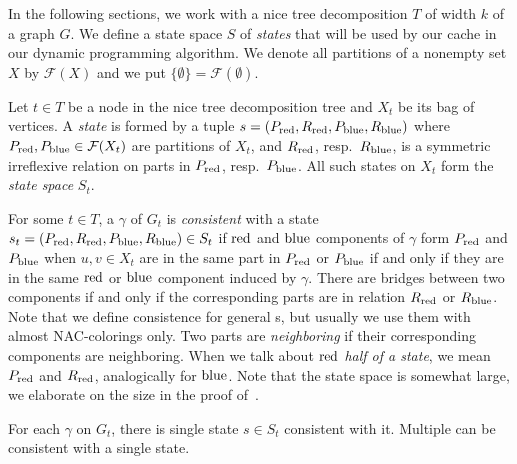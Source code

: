In the following sections,
we work with a nice tree decomposition \( T \) of width \( k \)
of a graph \( G \).
%
We define a state space \( S \) of \emph{states}
that will be used by our cache in our dynamic programming algorithm.
We denote all partitions of a nonempty set \( X \) by \( \mathcal{F}(X) \)
and we put \( \{\emptyset\} = \mathcal{F}(\emptyset) \).

%
\begin{definition}
	Let \( t \in T \) be a node in the nice tree decomposition tree and
	\( X_t \) be its bag of vertices.
	A \emph{state} is formed by a tuple \( s = (P_{\text{red}}, R_{\text{red}}, P_{\text{blue}}, R_{\text{blue}}) \)
	where \( P_{\text{red}}, P_{\text{blue}} \in \mathcal{F}(X_t)\) are partitions of \( X_t \),
	and \( R_{\text{red}}\), resp.\ \(R_{\text{blue}} \), is a symmetric irreflexive relation
	on parts in \( P_{\text{red}}\), resp.\ \(P_{\text{blue}} \).
	All such states on \( X_t \) form the \emph{state space} \( S_t \).
\end{definition}
%
For some \( t \in T \), a \rbcol{} \( \gamma \) of \( G_t \)
is \emph{consistent} with a state \( s_t = (P_{\text{red}}, R_{\text{red}}, P_{\text{blue}}, R_{\text{blue}}) \in S_t \)
if \( \text{red} \) and \( \text{blue} \) components of \( \gamma \) form \( P_{\text{red}} \) and \( P_{\text{blue}} \)
when \( u, v \in X_t \) are in the same part in \( P_{\text{red}} \) or \( P_{\text{blue}} \)
if and only if they are in the same \( \text{red} \) or \( \text{blue} \) component induced by \( \gamma \).
There are bridges between two components if and only if
the corresponding parts are in relation \( R_{\text{red}} \) or \( R_{\text{blue}} \).
%
Note that we define consistence for general \rbcol{}s,
but usually we use them with almost NAC-colorings only.
%
Two parts are \emph{neighboring} if their corresponding components are neighboring.
When we talk about \emph{\( \text{red} \) half of a state},
we mean \( P_{\text{red}} \) and \( R_{\text{red}} \),
analogically for \( \text{blue} \).
%
Note that the state space is somewhat large,
we elaborate on the size in the proof of~.
%
\begin{observation}
	For each \rbcol{} \( \gamma \) on \( G_t \),
	there is single state \( s \in S_t \) consistent with it.
	Multiple \rbcol{} can be consistent with a single state.
\end{observation}
%


